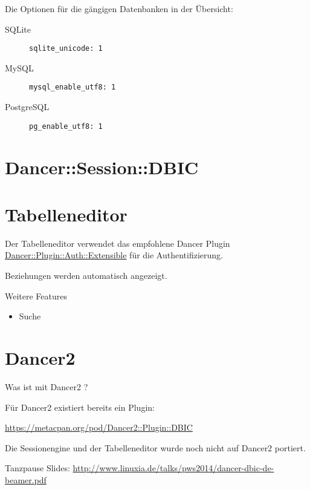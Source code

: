 Die Optionen für die gängigen Datenbanken in der Übersicht:

\begin{description}
\item[SQLite] \verb|sqlite_unicode: 1|
\item[MySQL] \verb|mysql_enable_utf8: 1|
\item[PostgreSQL] \verb|pg_enable_utf8: 1| 
\end{description}

\section{Dancer::Session::DBIC}

\section{Tabelleneditor}

Der Tabelleneditor verwendet das empfohlene Dancer Plugin
\href{https://metacpan.org/pod/Dancer::Plugin::Auth::Extensible}{Dancer::Plugin::Auth::Extensible}
für die Authentifizierung.

Beziehungen werden automatisch angezeigt.

\begin{frame}{Weitere Features}
\begin{itemize}
\item Suche
\end{itemize}
\end{frame}

\section{Dancer2}

Was ist mit Dancer2 ?

Für Dancer2 existiert bereits ein Plugin:

\url{https://metacpan.org/pod/Dancer2::Plugin::DBIC}

Die Sessionengine und der Tabelleneditor wurde noch nicht auf Dancer2 portiert.

\begin{frame}{Tanzpause}
Slides:
\url{http://www.linuxia.de/talks/pws2014/dancer-dbic-de-beamer.pdf}
\end{frame}



